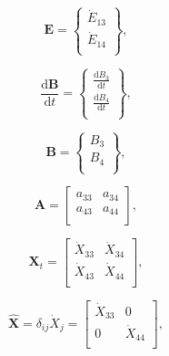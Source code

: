 \documentclass[authoryear,preprint,review,12pt]{elsarticle}
\let\oldhat\hat
\renewcommand{\vec}[1]{\mathbf{#1}}
\renewcommand{\hat}[1]{\oldhat{\mathbf{#1}}}
\begin{document}
\begin{equation} \label{eq:E_vec_def}
	\vec{E} =		\begin{Bmatrix} 	\dot{E}_{13}	\\
													\dot{E}_{14}\\
						\end{Bmatrix},
\end{equation}

\begin{equation} \label{eq:dBdt_vec_def}
	\frac{\mathrm{d}\vec{B}}{\mathrm{d}t} =	\begin{Bmatrix}	\frac{\mathrm{d}B_{3}}{\mathrm{d}t}	\\
																									\frac{\mathrm{d}B_{4}}{\mathrm{d}t}\\
																		\end{Bmatrix},
\end{equation}

\begin{equation} \label{eq:B_vec_def}
	\vec{B} =			\begin{Bmatrix}	B_{3}\\
														B_{4}\\
							\end{Bmatrix},
\end{equation}

\begin{equation} \label{eq:A_matrix_def}
	\vec{A} =	\begin{bmatrix} 	a_{33} & a_{34}	\\
												a_{43} & a_{44}	\\
					\end{bmatrix},
\end{equation}

\begin{equation} \label{eq:X_t_matrix_def}
	\vec{X}_{t} =		\begin{bmatrix} 	\dot{X}_{33}		&	\dot{X}_{34}	\\
														\dot{X}_{43}		&	\dot{X}_{44}\\
							\end{bmatrix},
\end{equation}

\begin{equation} \label{eq:X_hat_matrix_def}
	\hat{\vec{X}} = \delta_{ij}\dot{X}_{j} = \begin{bmatrix} 	\dot{X}_{33}		&	0					\\
																								0					&	\dot{X}_{44}	\\
																							\end{bmatrix},
\end{equation}
\end{document}
